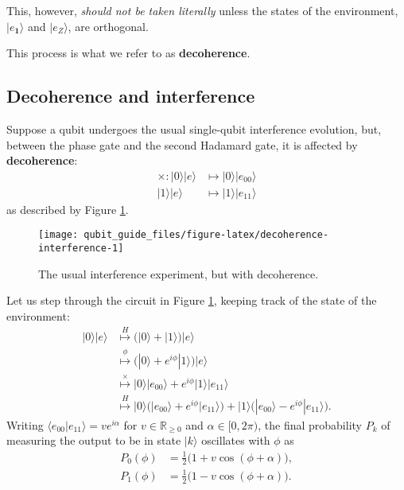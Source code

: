 \documentclass[fleqn]{article}
\renewcommand{\footnote}[1]{\en{#1}}
\begin{document}
This, however, \emph{should not be taken literally} unless the states of the environment, \(|e_{\mathbf{1}}\rangle\) and \(|e_Z\rangle\), are orthogonal.\footnote{Why not?}

This process is what we refer to as \textbf{decoherence}.

\hypertarget{decoherence-and-interference}{%
\subsection{Decoherence and interference}\label{decoherence-and-interference}}

Suppose a qubit undergoes the usual single-qubit interference evolution, but, between the phase gate and the second Hadamard gate, it is affected by \textbf{decoherence}:
\[
  \begin{aligned}
    \times\colon
    |0\rangle|e\rangle
    &\longmapsto |0\rangle|e_{00}\rangle
  \\|1\rangle|e\rangle
    &\longmapsto |1\rangle|e_{11}\rangle
  \end{aligned}
\]
as described by Figure \ref{fig:decoherence-interference}.

\begin{figure}[H]

{\centering \texttt{[image: qubit\_guide\_files/figure-latex/decoherence-interference-1]} 

}

\caption{The usual interference experiment, but with decoherence.}\label{fig:decoherence-interference}
\end{figure}

Let us step through the circuit in Figure \ref{fig:decoherence-interference}, keeping track of the state of the environment:
\[
  \begin{aligned}
    |0\rangle|e\rangle
    & \overset{H}{\longmapsto} \Big( |0\rangle + |1\rangle \Big) |e\rangle
  \\& \overset{\phi}{\longmapsto} \Big( |0\rangle + e^{i\phi}|1\rangle \Big) |e\rangle
  \\& \overset{\times}{\longmapsto} |0\rangle|e_{00}\rangle + e^{i\phi}|1\rangle|e_{11}\rangle
  \\& \overset{H}{\longmapsto} |0\rangle\Big( |e_{00}\rangle + e^{i\phi}|e_{11}\rangle \Big) + |1\rangle\Big( |e_{00}\rangle - e^{i\phi}|e_{11}\rangle \Big).
  \end{aligned}
\]
Writing \(\langle e_{00}|e_{11}\rangle=ve^{i\alpha}\) for \(v\in\mathbb{R}_{\geqslant 0}\) and \(\alpha\in[0,2\pi)\), the final probability \(P_k\) of measuring the output to be in state \(|k\rangle\) oscillates with \(\phi\) as
\[
  \begin{aligned}
    P_{0}(\phi) &= \frac{1}{2}\big(1 + v\cos(\phi + \alpha)\big),
  \\P_{1}(\phi) &= \frac{1}{2}\big(1 - v\cos(\phi + \alpha)\big).
  \end{aligned}
\]
\end{document}
